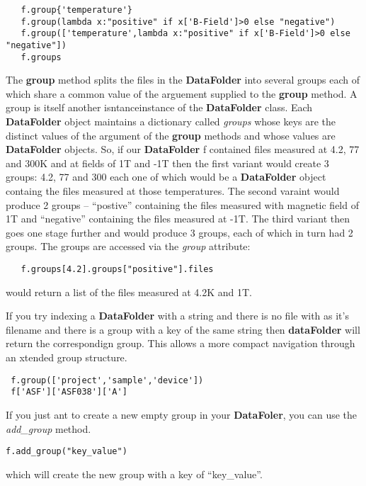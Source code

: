\documentclass[a4paper,11pt]{scrartcl}
\begin{document}
\begin{lstlisting}
   f.group{'temperature'}
   f.group(lambda x:"positive" if x['B-Field']>0 else "negative")
   f.group(['temperature',lambda x:"positive" if x['B-Field']>0 else "negative"])
   f.groups
\end{lstlisting}

The \textbf{group} method splits the files in the \textbf{DataFolder} into several groups each of which share a common value of the arguement supplied to the \textbf{group} method. A group is itself another isntanceinstance of the \textbf{DataFolder} class. Each \textbf{DataFolder} object maintains a dictionary called \textit{groups} whose keys are the distinct values of the argument of the \textbf{group} methods and whose values are \textbf{DataFolder} objects. So, if our \textbf{DataFolder} f contained files measured at 4.2, 77 and 300K and at fields of 1T and -1T then the first variant would create 3 groups: 4.2, 77 and 300 each one of which would be a \textbf{DataFolder} object containg the files measured at those temperatures. The second varaint would produce 2 groups -- ``postive'' containing the files measured with magnetic field of 1T and ``negative'' containing the files measured at -1T. The third variant then goes one stage further and would produce 3 groups, each of which in turn had 2 groups. The groups are accessed via the \textit{group} attribute:

\begin{lstlisting}
   f.groups[4.2].groups["positive"].files
\end{lstlisting}

would return a list of the files measured at 4.2K and 1T.

If you try indexing a \textbf{DataFolder} with a string and there is no file with as it's filename and there is a group with a key of the same string then \textbf{dataFolder} will return the correspondign group. This allows a more compact navigation through an xtended group structure.

\begin{lstlisting}
 f.group(['project','sample','device'])
 f['ASF']['ASF038']['A']
\end{lstlisting}

If you just ant to create a new empty group in your \textbf{DataFoler}, you can use the \textit{add\_group} method.
\begin{lstlisting}
f.add_group("key_value")
\end{lstlisting}
which will create the new group with a key of ``key\_value''.
\end{document}
